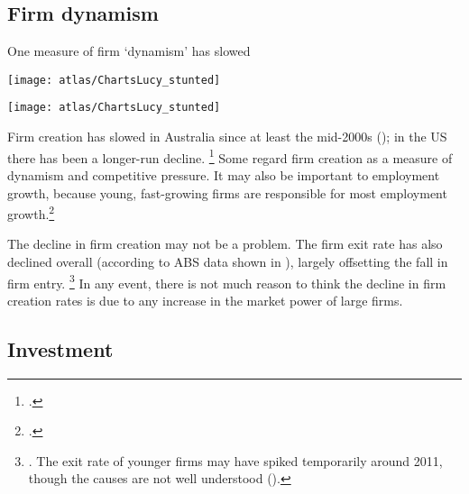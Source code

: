\subsection{Firm dynamism}

\begin{figureTop}
    \caption{One measure of firm ‘dynamism’ has slowed\label{fig:dynamism}}
     \vspace{3pt} 
    \texttt{[image: atlas/ChartsLucy\_stunted]}\vspace{5pt}
    
    \texttt{[image: atlas/ChartsLucy\_stunted]} 
\end{figureTop}

Firm creation has slowed in Australia since at least the mid-2000s (); in the US there has been a longer-run decline.%
\footcites{CEAcompetitionbriefmay2016, Furman_preso_2016} 
Some regard firm creation as a measure of dynamism and competitive pressure. It may also be important to employment growth, because young, fast-growing firms are responsible for most employment growth.\footcite{Industry_2015}

The decline in firm creation may not be a problem. The firm exit rate has also declined overall (according to ABS data shown in ), largely offsetting the fall in firm entry.%
    \footnote{\textcites{Breunig_2007}{IllusionsEntrepreneur2010}.
The exit rate of younger firms may have spiked temporarily around 2011, though the causes are not well understood (\textcite{Bakhtiari_2017}).}
In any event, there is not much reason to think the decline in firm creation rates is due to any increase in the market power of large firms. 


\subsection{Investment}

